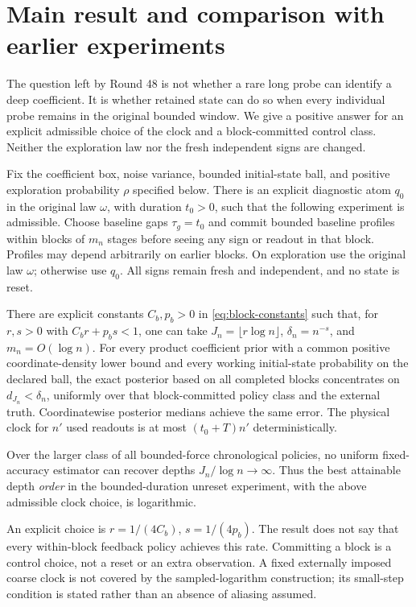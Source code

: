 \section{Main result and comparison with earlier experiments}
The question left by Round 48 is not whether a rare long probe can identify a
deep coefficient. It is whether retained state can do so when every individual
probe remains in the original bounded window. We give a positive answer for an
explicit admissible choice of the clock and a block-committed control class.
Neither the exploration law nor the fresh independent signs are changed.

\begin{theorem}
\label{thm:main}
Fix the coefficient box, noise variance, bounded initial-state ball, and positive
exploration probability $\rho$ specified below. There is an explicit diagnostic
atom $q_0$ in the original law $\omega$, with duration $t_0>0$, such that the
following experiment is admissible. Choose baseline gaps $\tau_g=t_0$ and
commit bounded baseline profiles within blocks of $m_n$ stages before seeing
any sign or readout in that block. Profiles may depend arbitrarily on earlier
blocks. On exploration use the original law $\omega$; otherwise use $q_0$.
All signs remain fresh and independent, and no state is reset.

There are explicit constants $C_b,p_b>0$ in \eqref{eq:block-constants} such that,
for $r,s>0$ with $C_b r+p_b s<1$, one can take
$J_n=\lfloor r\log n\rfloor$, $\delta_n=n^{-s}$, and $m_n=O(\log n)$.
For every product coefficient prior with a common positive coordinate-density
lower bound and every working initial-state probability on the declared ball,
the exact posterior based on all completed blocks concentrates on
$d_{J_n}<\delta_n$, uniformly over that block-committed policy class and the
external truth. Coordinatewise posterior medians achieve the same error.
The physical clock for $n'$ used readouts is at most $(t_0+T)n'$ deterministically.

Over the larger class of all bounded-force chronological policies, no uniform
fixed-accuracy estimator can recover depths $J_n/\log n\to\infty$.
Thus the best attainable depth \emph{order} in the bounded-duration unreset
experiment, with the above admissible clock choice, is logarithmic.
\end{theorem}

An explicit choice is $r=1/(4C_b)$, $s=1/(4p_b)$. The result does not say that
every within-block feedback policy achieves this rate. Committing a block is
a control choice, not a reset or an extra observation. A fixed externally
imposed coarse clock is not covered by the sampled-logarithm construction;
its small-step condition is stated rather than an absence of aliasing assumed.

